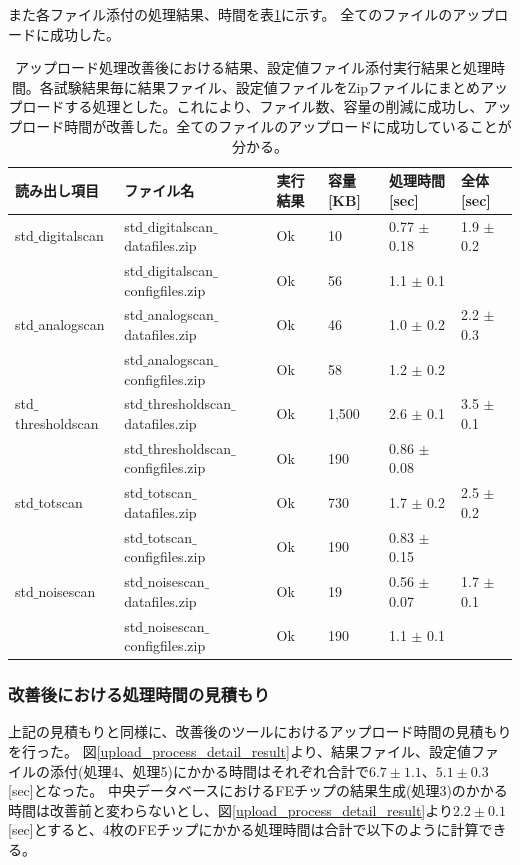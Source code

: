 また各ファイル添付の処理結果、時間を表\ref{upload_status_to_pd_zip}に示す。
全てのファイルのアップロードに成功した。

{\scriptsize
\begin{longtable}{|llllll|}
  \caption[アップロード処理改善後における結果、設定値ファイル添付実行結果と処理時間]{アップロード処理改善後における結果、設定値ファイル添付実行結果と処理時間。各試験結果毎に結果ファイル、設定値ファイルをZipファイルにまとめアップロードする処理とした。これにより、ファイル数、容量の削減に成功し、アップロード時間が改善した。全てのファイルのアップロードに成功していることが分かる。}
  \label{upload_status_to_pd_zip}
  \endhead
  \hline
  読み出し項目 & ファイル名 & 実行結果 & 容量[KB] & 処理時間[sec] & 全体[sec] \\ 
  \hline
 std$\_$digitalscan & std$\_$digitalscan$\_$datafiles.zip & Ok & 10 & 0.77 $\pm$ 0.18 & 1.9 $\pm$ 0.2\\
 & std$\_$digitalscan$\_$configfiles.zip & Ok & 56 & 1.1 $\pm$ 0.1 &\\
\hline
 std$\_$analogscan & std$\_$analogscan$\_$datafiles.zip & Ok & 46 & 1.0 $\pm$ 0.2 & 2.2 $\pm$ 0.3 \\
 & std$\_$analogscan$\_$configfiles.zip & Ok & 58 & 1.2 $\pm$ 0.2 &\\
\hline
 std$\_$thresholdscan & std$\_$thresholdscan$\_$datafiles.zip & Ok & 1,500 & 2.6 $\pm$ 0.1 & 3.5 $\pm$ 0.1 \\
 & std$\_$thresholdscan$\_$configfiles.zip & Ok & 190 & 0.86 $\pm$ 0.08 &\\
\hline
 std$\_$totscan & std$\_$totscan$\_$datafiles.zip & Ok & 730 & 1.7 $\pm$ 0.2 & 2.5 $\pm$ 0.2\\
 & std$\_$totscan$\_$configfiles.zip & Ok & 190 & 0.83 $\pm$ 0.15 &\\
\hline
 std$\_$noisescan & std$\_$noisescan$\_$datafiles.zip & Ok & 19 & 0.56 $\pm$ 0.07 & 1.7 $\pm$ 0.1 \\
 & std$\_$noisescan$\_$configfiles.zip & Ok & 190 & 1.1 $\pm$ 0.1 &\\
\hline
\end{longtable}
}

\subsubsection{改善後における処理時間の見積もり}
上記の見積もりと同様に、改善後のツールにおけるアップロード時間の見積もりを行った。
図\ref{upload_process_detail_result}より、結果ファイル、設定値ファイルの添付(処理4、処理5)にかかる時間はそれぞれ合計で$6.7\pm 1.1、5.1\pm 0.3$[sec]となった。
中央データベースにおけるFEチップの結果生成(処理3)のかかる時間は改善前と変わらないとし、図\ref{upload_process_detail_result}より$2.2\pm 0.1$[sec]とすると、4枚のFEチップにかかる処理時間は合計で以下のように計算できる。


